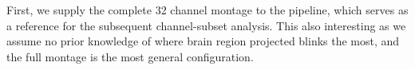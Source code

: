 First, we supply the complete 32 channel montage to the pipeline, which serves as a reference for the subsequent channel-subset analysis. This also interesting as we assume no prior knowledge of where brain region projected blinks the most, and the full montage is the most general configuration.



